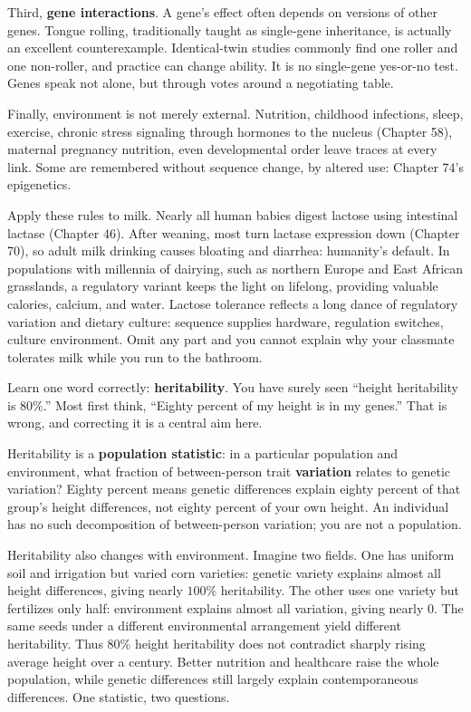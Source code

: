 Third, \textbf{gene interactions}. A gene's effect often depends on versions of other genes. Tongue rolling, traditionally taught as single-gene inheritance, is actually an excellent counterexample. Identical-twin studies commonly find one roller and one non-roller, and practice can change ability. It is no single-gene yes-or-no test. Genes speak not alone, but through votes around a negotiating table.

Finally, environment is not merely external. Nutrition, childhood infections, sleep, exercise, chronic stress signaling through hormones to the nucleus (Chapter 58), maternal pregnancy nutrition, even developmental order leave traces at every link. Some are remembered without sequence change, by altered use: Chapter 74's epigenetics.

Apply these rules to milk. Nearly all human babies digest lactose using intestinal lactase (Chapter 46). After weaning, most turn lactase expression down (Chapter 70), so adult milk drinking causes bloating and diarrhea: humanity's default. In populations with millennia of dairying, such as northern Europe and East African grasslands, a regulatory variant keeps the light on lifelong, providing valuable calories, calcium, and water. Lactose tolerance reflects a long dance of regulatory variation and dietary culture: sequence supplies hardware, regulation switches, culture environment. Omit any part and you cannot explain why your classmate tolerates milk while you run to the bathroom.

\begin{qiaoliang}
Learn one word correctly: \textbf{heritability}. You have surely seen ``height heritability is $80\%$.'' Most first think, ``Eighty percent of my height is in my genes.'' That is wrong, and correcting it is a central aim here.

Heritability is a \textbf{population statistic}: in a particular population and environment, what fraction of between-person trait \textbf{variation} relates to genetic variation? Eighty percent means genetic differences explain eighty percent of that group's height differences, not eighty percent of your own height. An individual has no such decomposition of between-person variation; you are not a population.

Heritability also changes with environment. Imagine two fields. One has uniform soil and irrigation but varied corn varieties: genetic variety explains almost all height differences, giving nearly $100\%$ heritability. The other uses one variety but fertilizes only half: environment explains almost all variation, giving nearly $0$. The same seeds under a different environmental arrangement yield different heritability. Thus $80\%$ height heritability does not contradict sharply rising average height over a century. Better nutrition and healthcare raise the whole population, while genetic differences still largely explain contemporaneous differences. One statistic, two questions.
\end{qiaoliang}


